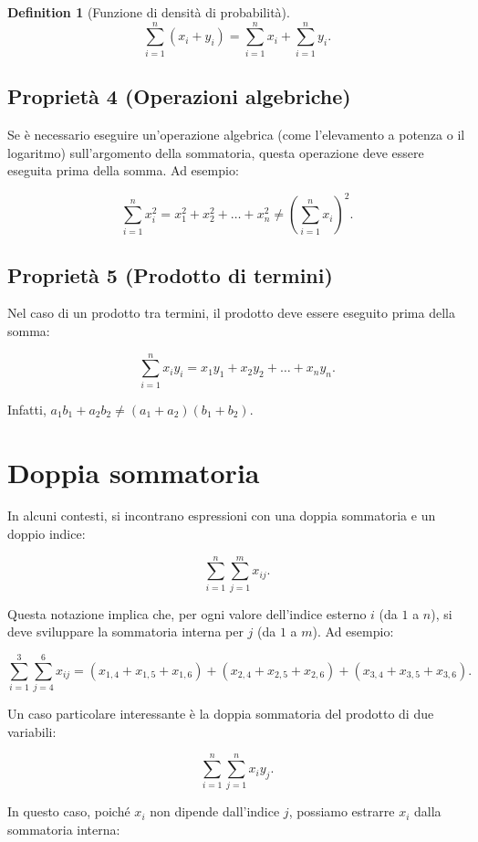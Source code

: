 \documentclass[
  letterpaper,
  DIV=11,
  numbers=noendperiod,
  oneside]{scrreprt}
\theoremstyle{definition}
\theoremstyle{plain}
\theoremstyle{definition}
\newtheorem{definition}{Definition}[chapter]
\theoremstyle{remark}
\begin{document}
\begin{definition}[Funzione di densità di
probabilità]
\[
\sum_{i=1}^{n} (x_i + y_i) = \sum_{i=1}^{n} x_i + \sum_{i=1}^{n} y_i.
\]

\subsection{Proprietà 4 (Operazioni
algebriche)}\label{proprietuxe0-4-operazioni-algebriche}

Se è necessario eseguire un'operazione algebrica (come l'elevamento a
potenza o il logaritmo) sull'argomento della sommatoria, questa
operazione deve essere eseguita prima della somma. Ad esempio:

\[
\sum_{i=1}^{n} x_i^2 = x_1^2 + x_2^2 + \dots + x_n^2 \neq \left( \sum_{i=1}^{n} x_i \right)^2.
\]

\subsection{Proprietà 5 (Prodotto di
termini)}\label{proprietuxe0-5-prodotto-di-termini}

Nel caso di un prodotto tra termini, il prodotto deve essere eseguito
prima della somma:

\[
\sum_{i=1}^{n} x_i y_i = x_1 y_1 + x_2 y_2 + \dots + x_n y_n.
\]

Infatti, \(a_1 b_1 + a_2 b_2 \neq (a_1 + a_2)(b_1 + b_2)\).

\section{Doppia sommatoria}\label{doppia-sommatoria}

In alcuni contesti, si incontrano espressioni con una doppia sommatoria
e un doppio indice:

\[
\sum_{i=1}^{n} \sum_{j=1}^{m} x_{ij}.
\]

Questa notazione implica che, per ogni valore dell'indice esterno \(i\)
(da \(1\) a \(n\)), si deve sviluppare la sommatoria interna per \(j\)
(da \(1\) a \(m\)). Ad esempio:

\[
\sum_{i=1}^{3} \sum_{j=4}^{6} x_{ij} = (x_{1,4} + x_{1,5} + x_{1,6}) + (x_{2,4} + x_{2,5} + x_{2,6}) + (x_{3,4} + x_{3,5} + x_{3,6}).
\]

Un caso particolare interessante è la doppia sommatoria del prodotto di
due variabili:

\[
\sum_{i=1}^{n} \sum_{j=1}^{n} x_i y_j.
\]

In questo caso, poiché \(x_i\) non dipende dall'indice \(j\), possiamo
estrarre \(x_i\) dalla sommatoria interna:


\end{definition}
\end{document}

